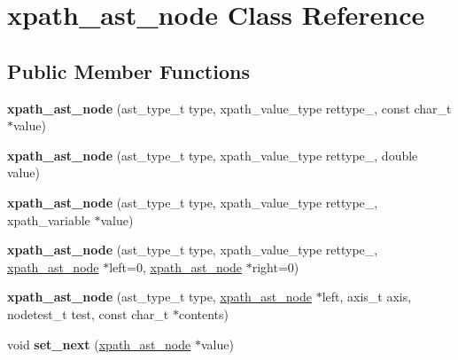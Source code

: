 \hypertarget{classxpath__ast__node}{\section{xpath\-\_\-ast\-\_\-node Class Reference}
\label{classxpath__ast__node}
}
\subsection*{Public Member Functions}
\begin{DoxyCompactItemize}
\item 
\hypertarget{classxpath__ast__node_af155d17a4477a693d37f4e34957dcc21}{{\bfseries xpath\-\_\-ast\-\_\-node} (ast\-\_\-type\-\_\-t type, xpath\-\_\-value\-\_\-type rettype\-\_\-, const char\-\_\-t $\ast$value)}\label{classxpath__ast__node_af155d17a4477a693d37f4e34957dcc21}

\item 
\hypertarget{classxpath__ast__node_ada97458f3fc7d6c87cf70d8084117b0d}{{\bfseries xpath\-\_\-ast\-\_\-node} (ast\-\_\-type\-\_\-t type, xpath\-\_\-value\-\_\-type rettype\-\_\-, double value)}\label{classxpath__ast__node_ada97458f3fc7d6c87cf70d8084117b0d}

\item 
\hypertarget{classxpath__ast__node_a8de4244f7b9fc7626049197ddc0afab7}{{\bfseries xpath\-\_\-ast\-\_\-node} (ast\-\_\-type\-\_\-t type, xpath\-\_\-value\-\_\-type rettype\-\_\-, xpath\-\_\-variable $\ast$value)}\label{classxpath__ast__node_a8de4244f7b9fc7626049197ddc0afab7}

\item 
\hypertarget{classxpath__ast__node_af6f4ffea3f3c7fdb6ef1e759d4b070f4}{{\bfseries xpath\-\_\-ast\-\_\-node} (ast\-\_\-type\-\_\-t type, xpath\-\_\-value\-\_\-type rettype\-\_\-, \hyperlink{classxpath__ast__node}{xpath\-\_\-ast\-\_\-node} $\ast$left=0, \hyperlink{classxpath__ast__node}{xpath\-\_\-ast\-\_\-node} $\ast$right=0)}\label{classxpath__ast__node_af6f4ffea3f3c7fdb6ef1e759d4b070f4}

\item 
\hypertarget{classxpath__ast__node_a7cf74b277deba86a6575796c727fe458}{{\bfseries xpath\-\_\-ast\-\_\-node} (ast\-\_\-type\-\_\-t type, \hyperlink{classxpath__ast__node}{xpath\-\_\-ast\-\_\-node} $\ast$left, axis\-\_\-t axis, nodetest\-\_\-t test, const char\-\_\-t $\ast$contents)}\label{classxpath__ast__node_a7cf74b277deba86a6575796c727fe458}

\item 
\hypertarget{classxpath__ast__node_a2764184d076834284eb3ff3182b845cc}{void {\bfseries set\-\_\-next} (\hyperlink{classxpath__ast__node}{xpath\-\_\-ast\-\_\-node} $\ast$value)}\label{classxpath__ast__node_a2764184d076834284eb3ff3182b845cc}


\end{DoxyCompactItemize}

